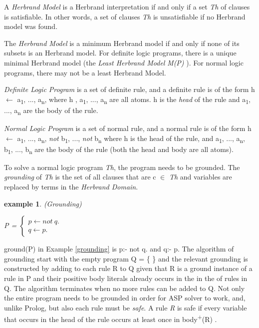 \documentclass[12pt,twoside]{report}
\newtheorem{examp}{example}[section]
\begin{document}
A \textit{Herbrand Model} is a Herbrand interpretation if and only if a set \textit{Th} of clauses is satisfiable. In other words, a set of clauses \textit{Th} is unsatisfiable if no Herbrand model was found.

The \textit{Herbrand Model} is a minimum Herbrand model if and only if none of its subsets is an Herbrand model.
For definite logic programs, there is a unique minimal Herbrand model (the \textit{Least Herbrand Model} \textit{M(P)} ).
For normal logic programs, there may not be a least Herbrand Model.

\textit{Definite Logic Program} is a set of definite rule, and  a definite rule is of the form h $\leftarrow$ a\textsubscript{1}, ..., a\textsubscript{n}, where h , a\textsubscript{1}, ..., a\textsubscript{n} are all atoms. h is the \textit{head} of the rule and a\textsubscript{1}, ..., a\textsubscript{n} are the body of the rule.

\textit{Normal Logic Program} is a set of normal rule, and a normal rule is of the form h $\leftarrow$ a\textsubscript{1}, ..., a\textsubscript{n}, \textit{not} b\textsubscript{1}, ..., \textit{not}  b\textsubscript{n} where h is the head of the rule,
 and a\textsubscript{1}, ..., a\textsubscript{n}, b\textsubscript{1}, ..., b\textsubscript{n} are the body of the rule (both the head and body are all atoms).

To solve a normal logic program \textit{Th}, the program needs to be grounded. The \textit{grounding} of \textit{Th} is the set of all clauses that are c $\in$ \textit{Th} and variables are replaced by terms in the \textit{Herbrand Domain}.

\begin{examp} \normalfont (Grounding)

P = $\begin{cases}
	p  \leftarrow not \ q. \\
	q  \leftarrow p.
      \end{cases}$
\end{examp}
\label{grounding}

ground(P) in Example \ref{grounding} is p:- not q. and q:- p. The algorithm of grounding start with the empty program Q = \{  \} and the relevant grounding is constructed by adding to each rule R to Q given that R is a ground instance of a rule in P and their positive body literals already occurs in the in the of rules in Q. The algorithm terminates when no more rules can be added to Q.
Not only the entire program needs to be grounded in order for ASP solver to work, and, unlike Prolog,  but also each rule must be \textit{safe}. A rule \textit{R} is safe if every variable that occurs in the head of the rule occurs at least once in body\textsuperscript{+}(R) .
\end{document}
